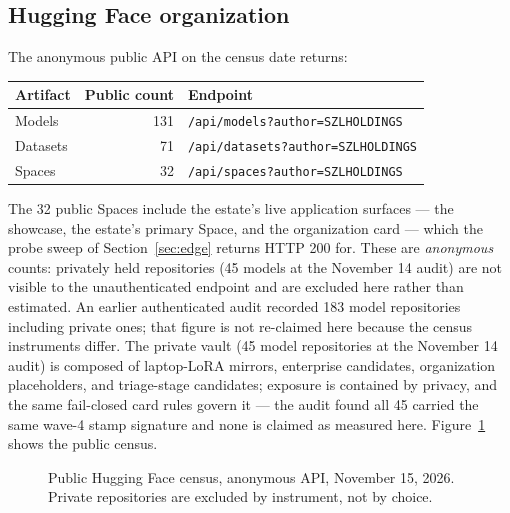 \documentclass[11pt]{article}
\begin{document}
\subsection{Hugging Face organization}
The anonymous public API on the census date returns:
\begin{center}
\begin{tabular}{lrl}
\toprule
\textbf{Artifact} & \textbf{Public count} & \textbf{Endpoint} \\
\midrule
Models & 131 & \texttt{/api/models?author=SZLHOLDINGS} \\
Datasets & 71 & \texttt{/api/datasets?author=SZLHOLDINGS} \\
Spaces & 32 & \texttt{/api/spaces?author=SZLHOLDINGS} \\
\bottomrule
\end{tabular}
\end{center}
The 32 public Spaces include the estate's live application surfaces --- the showcase, the estate's primary Space, and the organization card --- which the probe sweep of Section~\ref{sec:edge} returns HTTP 200 for. These are \emph{anonymous} counts: privately held repositories (45 models at the November 14 audit) are not visible to the unauthenticated endpoint and are excluded here rather than estimated. An earlier authenticated audit recorded 183 model repositories including private ones; that figure is not re-claimed here because the census instruments differ. The private vault (45 model repositories at the November 14 audit) is composed of laptop-LoRA mirrors, enterprise candidates, organization placeholders, and triage-stage candidates; exposure is contained by privacy, and the same fail-closed card rules govern it --- the audit found all 45 carried the same wave-4 stamp signature and none is claimed as measured here. Figure~\ref{fig:census} shows the public census.

\begin{figure}[htbp]
\centering
{}
\caption{Public Hugging Face census, anonymous API, November 15, 2026. Private repositories are excluded by instrument, not by choice.}
\label{fig:census}
\end{figure}
\end{document}
